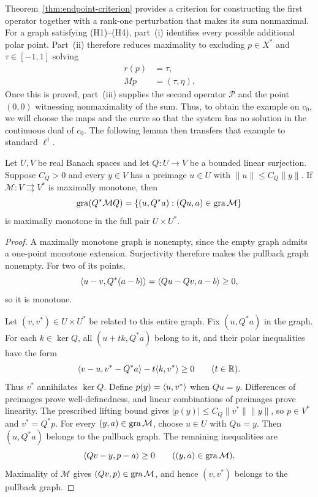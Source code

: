 Theorem~\ref{thm:endpoint-criterion} provides a criterion for constructing
the first operator together with a rank-one perturbation that makes its
sum nonmaximal. For a graph satisfying \textup{(H1)--(H4)}, part~(i)
identifies every possible additional polar point. Part~(ii) therefore
reduces maximality to excluding $p\in X^*$ and $\tau\in[-1,1]$ solving
\[
\begin{aligned}
r(p)&=\tau,\\
Mp&=(\tau,\eta).
\end{aligned}
\]
Once this is proved, part~(iii) supplies the second
operator $\mathcal P$ and the point $(0,0)$ witnessing nonmaximality
of the sum. Thus, to obtain the example on $c_0$, we will choose
the maps and the curve so that the system has no solution in
the continuous dual of $c_0$. The following lemma then transfers that example
to standard $\ell^1$.

\begin{lemma}
\label{lem:surjection-transport}
Let $U,V$ be real Banach spaces and let $Q:U\to V$ be a bounded
linear surjection. Suppose $C_Q>0$ and every $y\in V$ has a preimage
$u\in U$ with $\|u\|\le C_Q\|y\|$. If
$\mathcal M:V\rightrightarrows V^*$ is maximally monotone, then
\[
\operatorname{gra}(Q^*\mathcal M Q)
=\{(u,Q^*a):(Qu,a)\in\operatorname{gra}\mathcal M\}
\]
is maximally monotone in the full pair $U\times U^*$.
\end{lemma}
\begin{proof}
A maximally monotone graph is nonempty, since the empty graph admits
a one-point monotone extension. Surjectivity therefore makes the
pullback graph nonempty. For two of its points,
\[
\langle u-v,Q^*(a-b)\rangle=\langle Qu-Qv,a-b\rangle\ge0,
\]
so it is monotone.

Let $(v,v^*)\in U\times U^*$ be related to this entire graph. Fix
$(u,Q^*a)$ in the graph. For each $k\in\ker Q$, all $(u+t k,Q^*a)$ belong to it,
and their polar inequalities have the form
\[
\langle v-u,v^*-Q^*a\rangle-t\langle k,v^*\rangle\ge0
\qquad(t\in\mathbb R).
\]
Thus $v^*$ annihilates $\ker Q$. Define $p(y)=\langle u,v^*\rangle$ when
$Qu=y$. Differences of preimages prove well-definedness, and linear
combinations of preimages prove linearity. The prescribed lifting bound
gives $|p(y)|\le C_Q\|v^*\|\|y\|$, so $p\in V^*$ and $v^*=Q^*p$.
For every $(y,a)\in\operatorname{gra}\mathcal M$, choose $u\in U$ with $Qu=y$.
Then $(u,Q^*a)$ belongs to the pullback graph. The remaining
inequalities are
\[
\langle Qv-y,p-a\rangle\ge0\qquad((y,a)\in\operatorname{gra}\mathcal M).
\]
Maximality of $\mathcal M$ gives $(Qv,p)\in\operatorname{gra}\mathcal M$, and hence
$(v,v^*)$ belongs to the pullback graph.
\end{proof}

